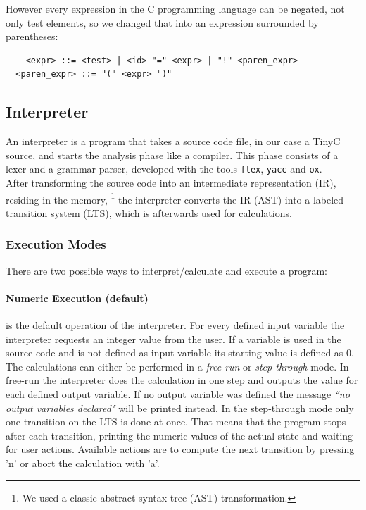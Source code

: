 \documentclass[english,a4paper,oneside]{article}%
\begin{document}
However every expression in the C programming language can be negated, not only test elements, so we changed that into an expression surrounded by parentheses: 

\begin{scriptsize}
\begin{lstlisting}
	<expr> ::= <test> | <id> "=" <expr> | "!" <paren_expr>
  <paren_expr> ::= "(" <expr> ")"
\end{lstlisting}
\end{scriptsize}


\subsection{Interpreter}
An interpreter is a program that takes a source code file, in our case a TinyC source, and starts the analysis phase like a compiler. This phase consists of a lexer and a grammar parser, developed with the tools \texttt{flex}, \texttt{yacc} and \texttt{ox}.\\

After transforming the source code into an intermediate representation (IR), residing in the memory, \footnote{We used a classic abstract syntax tree (AST) transformation.} the interpreter converts the IR (AST) into a labeled transition system (LTS), which is afterwards used for calculations.

\subsubsection{Execution Modes}
There are two possible ways to interpret/calculate and execute a program:


\paragraph{Numeric Execution (default)}
is the default operation of the interpreter. For every defined input variable the interpreter requests an integer value from the user. If a variable is used in the source code and is not defined as input variable its starting value is defined as $0$.
%
The calculations can either be performed in a \textit{free-run} or \textit{step-through} mode. In free-run the interpreter does the calculation in one step and outputs the value for each defined output variable. If no output variable was defined the message \textit{``no output variables declared"} will be printed instead. In the step-through mode only one transition on the LTS is done at once. That means that the program stops after each transition, printing the numeric values of the actual state and waiting for user actions. Available actions are to compute the next transition by pressing 'n' or abort the calculation with 'a'.
\end{document}
